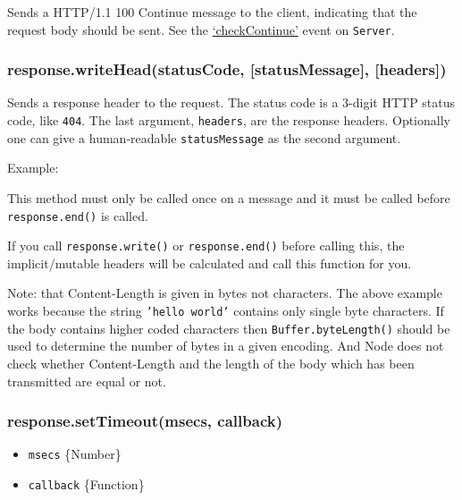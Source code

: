 Sends a HTTP/1.1 100 Continue message to the client, indicating that the
request body should be sent. See the
\hyperref[http\_event\_checkcontinue]{`checkContinue'} event on
\texttt{Server}.

\subsubsection{response.writeHead(statusCode, {[}statusMessage{]},
{[}headers{]})}

Sends a response header to the request. The status code is a 3-digit
HTTP status code, like \texttt{404}. The last argument,
\texttt{headers}, are the response headers. Optionally one can give a
human-readable \texttt{statusMessage} as the second argument.

Example:

\begin{Shaded}
\begin{Highlighting}[]
 \NormalTok{;}
\NormalTok{(}\NormalTok{, \{}
  \NormalTok{: }\NormalTok{,}
  \NormalTok{: } \NormalTok{\});}
\end{Highlighting}
\end{Shaded}

This method must only be called once on a message and it must be called
before \texttt{response.end()} is called.

If you call \texttt{response.write()} or \texttt{response.end()} before
calling this, the implicit/mutable headers will be calculated and call
this function for you.

Note: that Content-Length is given in bytes not characters. The above
example works because the string \texttt{'hello world'} contains only
single byte characters. If the body contains higher coded characters
then \texttt{Buffer.byteLength()} should be used to determine the number
of bytes in a given encoding. And Node does not check whether
Content-Length and the length of the body which has been transmitted are
equal or not.

\subsubsection{response.setTimeout(msecs, callback)}

\begin{itemize}
\item
  \texttt{msecs} \{Number\}
\item
  \texttt{callback} \{Function\}
\end{itemize}

